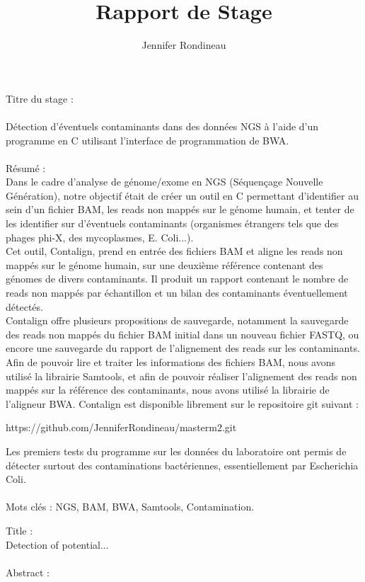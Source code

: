 \documentclass[a4paper,12pt]{article}
\title{Rapport de Stage}
\author{Jennifer Rondineau}
\begin{document}
 

Titre du stage : \\\\
Détection d'éventuels contaminants dans des données NGS à l'aide d'un programme en C utilisant l'interface de programmation de BWA. \\
\\
Résumé : \\

Dans le cadre d'analyse de génome/exome en NGS (Séquençage Nouvelle Génération), notre objectif était de créer un outil en C permettant d'identifier au sein d'un fichier BAM, les reads non mappés sur le génome humain, et tenter de les identifier sur d'éventuels contaminants (organismes étrangers tels que des phages phi-X, des mycoplasmes, E. Coli...). \\
Cet outil, Contalign, prend en entrée des fichiers BAM et aligne les reads non mappés sur le génome humain, sur une deuxième référence contenant des génomes de divers contaminants. Il produit un rapport contenant le nombre de reads non mappés par échantillon et un bilan des contaminants éventuellement détectés. \\
Contalign offre plusieurs propositions de sauvegarde, notamment la sauvegarde des reads non mappés du fichier BAM initial dans un nouveau fichier FASTQ, ou encore une sauvegarde du rapport de l'alignement des reads sur les contaminants.\\
Afin de pouvoir lire et traiter les informations des fichiers BAM, nous avons utilisé la librairie Samtools, et afin de pouvoir réaliser l'alignement des reads non mappés sur la référence des contaminants, nous avons utilisé la librairie de l'aligneur BWA. Contalign est disponible librement sur le repositoire git suivant : \begin{center} https://github.com/JenniferRondineau/masterm2.git \end{center}
Les premiers tests du programme sur les données du laboratoire ont permis de détecter surtout des contaminations bactériennes, essentiellement par  Escherichia Coli.\\\\

Mots clés : NGS, BAM, BWA, Samtools, Contamination. \\
\clearpage

Title : \\

Detection of potential... \\
\\
Abstract : \\
\end{document}
